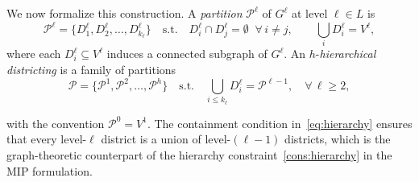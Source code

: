 \documentclass[11pt]{article}
\theoremstyle{definition}
\begin{document}
We now formalize this construction. A \emph{partition} $\mathcal{P}^\ell$ of
$G^\ell$ at level $\ell \in L$ is
%
\begin{equation}\label{eq:partition}
    \mathcal{P}^\ell = \{D_1^\ell, D_2^\ell, \dots, D_{k_\ell}^\ell\}
    \quad \text{s.t.} \quad
    D^\ell_i \cap D^\ell_j = \emptyset \;\; \forall\, i \neq j, \qquad \textstyle\bigcup_{i} D^\ell_i = V^\ell,
\end{equation}
%
where each $D_i^\ell \subseteq V^\ell$ induces a connected subgraph of
$G^\ell$. An $h$-\emph{hierarchical districting} is a family of partitions
%
\begin{equation}\label{eq:hierarchy}
    \mathcal{P} = \{\mathcal{P}^1, \mathcal{P}^2, \ldots, \mathcal{P}^h\}
    \quad \text{s.t.} \quad
    \bigcup_{i \leq k_\ell} D_i^\ell = \mathcal{P}^{\ell-1},
    \quad \forall\, \ell \geq 2,
\end{equation}
%




\noindent with the convention $\mathcal{P}^0 = V^1$. The containment condition
in~\eqref{eq:hierarchy} ensures that every level-$\ell$ district is a union of
level-$(\ell{-}1)$ districts, which is the graph-theoretic counterpart of the
hierarchy constraint~\eqref{cons:hierarchy} in the MIP formulation.
\end{document}
